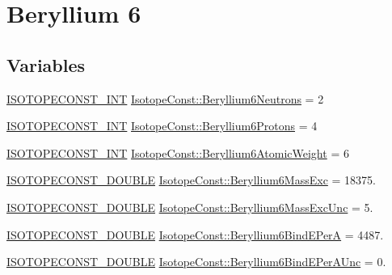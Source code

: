 \hypertarget{group___isotope_const-_beryllium-_be6}{}\section{Beryllium 6}
\label{group___isotope_const-_beryllium-_be6}
\subsection*{Variables}
\begin{DoxyCompactItemize}
\item 
\mbox{\hyperlink{group___isotope_const-_macros_ga5f18360b3e99483a35c32d789e62621c}{I\+S\+O\+T\+O\+P\+E\+C\+O\+N\+S\+T\+\_\+\+I\+NT}} \mbox{\hyperlink{group___isotope_const-_beryllium-_be6_gada28c5a9852d05785c00c0d9d01d6c1b}{Isotope\+Const\+::\+Beryllium6\+Neutrons}} = 2
\item 
\mbox{\hyperlink{group___isotope_const-_macros_ga5f18360b3e99483a35c32d789e62621c}{I\+S\+O\+T\+O\+P\+E\+C\+O\+N\+S\+T\+\_\+\+I\+NT}} \mbox{\hyperlink{group___isotope_const-_beryllium-_be6_ga3ab3638132a9de026ff9634bc5d41199}{Isotope\+Const\+::\+Beryllium6\+Protons}} = 4
\item 
\mbox{\hyperlink{group___isotope_const-_macros_ga5f18360b3e99483a35c32d789e62621c}{I\+S\+O\+T\+O\+P\+E\+C\+O\+N\+S\+T\+\_\+\+I\+NT}} \mbox{\hyperlink{group___isotope_const-_beryllium-_be6_gac60b4f1a8a3c96352b1087bd8c11ffa8}{Isotope\+Const\+::\+Beryllium6\+Atomic\+Weight}} = 6
\item 
\mbox{\hyperlink{group___isotope_const-_macros_ga8f45a7272ce02c0b4c65c44636ed719a}{I\+S\+O\+T\+O\+P\+E\+C\+O\+N\+S\+T\+\_\+\+D\+O\+U\+B\+LE}} \mbox{\hyperlink{group___isotope_const-_beryllium-_be6_ga3ec4d853e0612243bc7aa7ddb176aac5}{Isotope\+Const\+::\+Beryllium6\+Mass\+Exc}} = 18375.
\item 
\mbox{\hyperlink{group___isotope_const-_macros_ga8f45a7272ce02c0b4c65c44636ed719a}{I\+S\+O\+T\+O\+P\+E\+C\+O\+N\+S\+T\+\_\+\+D\+O\+U\+B\+LE}} \mbox{\hyperlink{group___isotope_const-_beryllium-_be6_ga8b0d1715ff59d26abdc2781b6bd7c9da}{Isotope\+Const\+::\+Beryllium6\+Mass\+Exc\+Unc}} = 5.
\item 
\mbox{\hyperlink{group___isotope_const-_macros_ga8f45a7272ce02c0b4c65c44636ed719a}{I\+S\+O\+T\+O\+P\+E\+C\+O\+N\+S\+T\+\_\+\+D\+O\+U\+B\+LE}} \mbox{\hyperlink{group___isotope_const-_beryllium-_be6_ga3ea700b479c3da2a8ee7af9b8cfd920a}{Isotope\+Const\+::\+Beryllium6\+Bind\+E\+PerA}} = 4487.
\item 
\mbox{\hyperlink{group___isotope_const-_macros_ga8f45a7272ce02c0b4c65c44636ed719a}{I\+S\+O\+T\+O\+P\+E\+C\+O\+N\+S\+T\+\_\+\+D\+O\+U\+B\+LE}} \mbox{\hyperlink{group___isotope_const-_beryllium-_be6_ga70e8ef1d109f095dd33708326649c210}{Isotope\+Const\+::\+Beryllium6\+Bind\+E\+Per\+A\+Unc}} = 0.

\end{DoxyCompactItemize}
